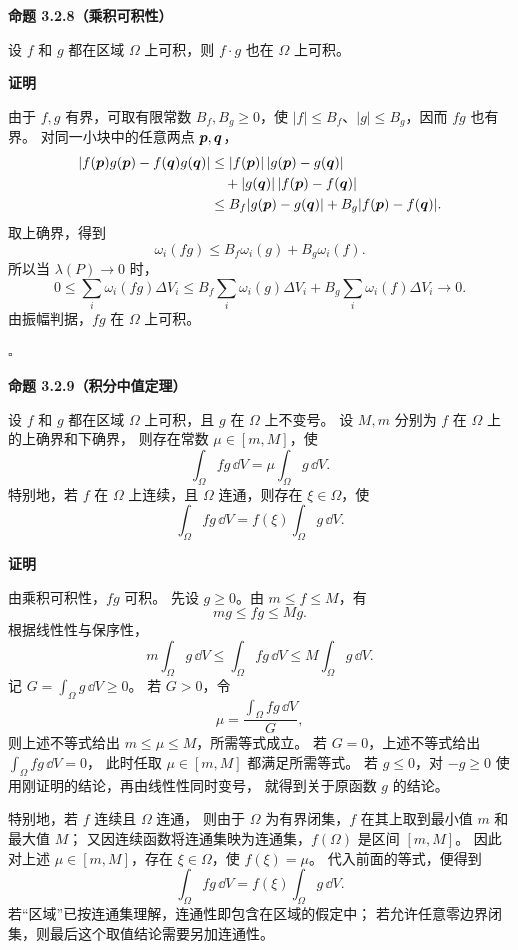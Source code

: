 \textbf{命题 3.2.8（乘积可积性）}


设 $f$ 和 $g$ 都在区域 $\Omega$ 上可积，则 $f\cdot g$ 也在 $\Omega$ 上可积。





\textbf{证明}

由于 $f,g$ 有界，可取有限常数 $B_f,B_g\ge0$，使
$|f|\le B_f$、$|g|\le B_g$，因而 $fg$ 也有界。
对同一小块中的任意两点 $\boldsymbol{p},\boldsymbol{q}$，
\[
\begin{aligned}
|f(\boldsymbol{p})g(\boldsymbol{p})-f(\boldsymbol{q})g(\boldsymbol{q})|
&\le |f(\boldsymbol{p})|\,|g(\boldsymbol{p})-g(\boldsymbol{q})|\\
&\quad+|g(\boldsymbol{q})|\,|f(\boldsymbol{p})-f(\boldsymbol{q})|\\
&\le B_f|g(\boldsymbol{p})-g(\boldsymbol{q})|
+B_g|f(\boldsymbol{p})-f(\boldsymbol{q})|.
\end{aligned}
\]
取上确界，得到
\[
\omega_i(fg)\le B_f\omega_i(g)+B_g\omega_i(f).
\]
所以当 $\lambda(P)\to0$ 时，
\[
0\le\sum_i\omega_i(fg)\Delta V_i
\le B_f\sum_i\omega_i(g)\Delta V_i
+B_g\sum_i\omega_i(f)\Delta V_i\longrightarrow0.
\]
由振幅判据，$fg$ 在 $\Omega$ 上可积。


$\square$





\textbf{命题 3.2.9（积分中值定理）}


设 $f$ 和 $g$ 都在区域 $\Omega$ 上可积，且 $g$ 在 $\Omega$ 上不变号。
设 $M,m$ 分别为 $f$ 在 $\Omega$ 上的上确界和下确界，
则存在常数 $\mu\in[m,M]$，使
\[
\int_\Omega f g\,\dd V=\mu\int_\Omega g\,\dd V.
\]
特别地，若 $f$ 在 $\Omega$ 上连续，且 $\Omega$ 连通，则存在 $\xi\in\Omega$，使
\[
\int_\Omega f g\,\dd V=f(\xi)\int_\Omega g\,\dd V.
\]





\textbf{证明}

由乘积可积性，$fg$ 可积。
先设 $g\ge0$。由 $m\le f\le M$，有
\[
mg\le fg\le Mg.
\]
根据线性性与保序性，
\[
m\int_\Omega g\,\dd V
\le\int_\Omega fg\,\dd V
\le M\int_\Omega g\,\dd V.
\]
记 $G=\displaystyle\int_\Omega g\,\dd V\ge0$。
若 $G>0$，令
\[
\mu=\frac{\displaystyle\int_\Omega fg\,\dd V}{G},
\]
则上述不等式给出 $m\le\mu\le M$，所需等式成立。
若 $G=0$，上述不等式给出 $\displaystyle\int_\Omega fg\,\dd V=0$，
此时任取 $\mu\in[m,M]$ 都满足所需等式。
若 $g\le0$，对 $-g\ge0$ 使用刚证明的结论，再由线性性同时变号，
就得到关于原函数 $g$ 的结论。

特别地，若 $f$ 连续且 $\Omega$ 连通，
则由于 $\Omega$ 为有界闭集，$f$ 在其上取到最小值 $m$ 和最大值 $M$；
又因连续函数将连通集映为连通集，$f(\Omega)$ 是区间 $[m,M]$。
因此对上述 $\mu\in[m,M]$，存在 $\xi\in\Omega$，使 $f(\xi)=\mu$。
代入前面的等式，便得到
\[
\int_\Omega fg\,\dd V=f(\xi)\int_\Omega g\,\dd V.
\]
若“区域”已按连通集理解，连通性即包含在区域的假定中；
若允许任意零边界闭集，则最后这个取值结论需要另加连通性。


